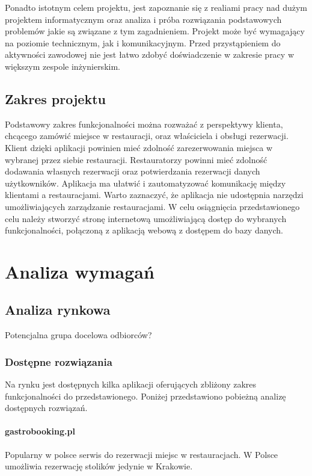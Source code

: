 \documentclass{article}
\begin{document}
Ponadto istotnym celem projektu, jest zapoznanie się z realiami pracy nad dużym projektem informatycznym oraz analiza i próba rozwiązania podstawowych problemów jakie są związane z tym zagadnieniem. Projekt może być wymagający na poziomie technicznym, jak i komunikacyjnym. Przed przystąpieniem do aktywności zawodowej nie jest łatwo zdobyć doświadczenie w zakresie pracy w większym zespole inżynierskim.
\subsection{Zakres projektu}
Podstawowy zakres funkcjonalności można rozważać z perspektywy klienta, chcącego zamówić miejsce w restauracji, oraz właściciela i obsługi rezerwacji. Klient dzięki aplikacji powinien mieć zdolność zarezerwowania miejsca w wybranej przez siebie restauracji. Restauratorzy powinni mieć zdolność dodawania własnych rezerwacji oraz potwierdzania rezerwacji danych użytkowników. Aplikacja ma ułatwić i zautomatyzować komunikację między klientami a restauracjami. Warto zaznaczyć, że aplikacja nie udostępnia narzędzi umożliwiających zarządzanie restauracjami. W celu osiągnięcia przedstawionego celu należy stworzyć stronę internetową umożliwiającą dostęp do wybranych funkcjonalności, połączoną z aplikacją webową z dostępem do bazy danych.



\section{Analiza wymagań}

\subsection{Analiza rynkowa}
Potencjalna grupa docelowa odbiorców?
\subsubsection{Dostępne rozwiązania}

Na rynku jest dostępnych kilka aplikacji oferujących zbliżony zakres funkcjonalności do przedstawionego. Poniżej przedstawiono pobieżną analizę dostępnych rozwiązań.

\paragraph{gastrobooking.pl}
Popularny w polsce serwis do rezerwacji miejsc w restauracjach. W Polsce umożliwia rezerwację stolików jedynie w Krakowie. 
\end{document}
